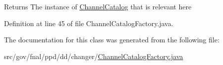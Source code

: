 \begin{DoxyReturn}{Returns}
The instance of \hyperlink{interfacegov_1_1fnal_1_1ppd_1_1dd_1_1changer_1_1ChannelCatalog}{Channel\-Catalog} that is relevant here 
\end{DoxyReturn}


Definition at line 45 of file Channel\-Catalog\-Factory.\-java.



The documentation for this class was generated from the following file\-:\begin{DoxyCompactItemize}
\item 
src/gov/fnal/ppd/dd/changer/\hyperlink{ChannelCatalogFactory_8java}{Channel\-Catalog\-Factory.\-java}\end{DoxyCompactItemize}
